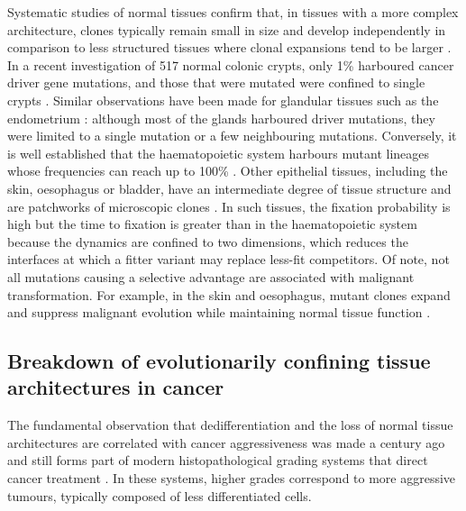 Systematic studies of normal tissues confirm that, in tissues with a more complex architecture, clones typically remain small in size and develop independently in comparison to less structured tissues where clonal expansions tend to be larger \parencite{Li2021-th}. In a recent investigation of 517 normal colonic crypts, only 1\% harboured cancer driver gene mutations, and those that were mutated were confined to single crypts \parencite{Lee-Six2019-fy}. Similar observations have been made for glandular tissues such as the endometrium \parencite{Moore2020-qb}: although most of the glands harboured driver mutations, they were limited to a single mutation or a few neighbouring mutations. Conversely, it is well established that the haematopoietic system harbours mutant lineages whose frequencies can reach up to 100\% \parencite{Genovese2014-wm,Jaiswal2014-tz}. Other epithelial tissues, including the skin, oesophagus or bladder, have an intermediate degree of tissue structure and are patchworks of microscopic clones \parencite{Moore2021-yr,Martincorena2015-yu,Martincorena2018-rl,Lawson2020-as} . In such tissues, the fixation probability is high but the time to fixation is greater than in the haematopoietic system because the dynamics are confined to two dimensions, which reduces the interfaces at which a fitter variant may replace less-fit competitors. Of note, not all mutations causing a selective advantage are associated with malignant transformation. For example, in the skin and oesophagus,  mutant clones expand and suppress malignant evolution while maintaining normal tissue function \parencite{Martincorena2015-yu,Martincorena2018-rl, Colom2021-mk,Fowler2021-bl, Abby2021-ik}.

\subsection*{Breakdown of evolutionarily confining tissue architectures in cancer}

The fundamental observation that dedifferentiation and the loss of normal tissue architectures are correlated with cancer aggressiveness was made a century ago and still forms part of modern histopathological grading systems that direct cancer treatment \parencite{Louis2007-ia,Elston1991-md,Epstein2016-un,Greenough1925-wg}. In these systems, higher grades correspond to more aggressive tumours, typically composed of less differentiated cells.

